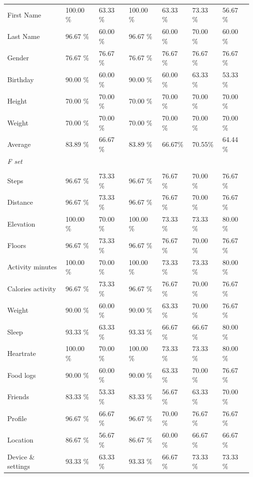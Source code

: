 \begin{table}
\begin{tabular}{P{2.5cm}P{1.7cm}P{1.6cm}P{1.5cm}P{1.5cm}P{1.5cm}P{1.9cm}}
First Name &100.00 \% & 63.33 \% &100.00 \%& 63.33 \%& 73.33 \% & 56.67 \%\\
Last Name &96.67 \% &60.00 \% &96.67 \%& 60.00 \%& 70.00 \% & 60.00 \%\\
Gender &76.67 \% &76.67 \% & 76.67 \% & 76.67 \%& 76.67 \% & 76.67 \%\\
Birthday &90.00 \%&60.00 \% &90.00 \%  & 60.00 \% & 63.33 \%& 53.33 \%\\
Height &70.00 \% &70.00 \% & 70.00 \% & 70.00 \% & 70.00 \%& 70.00 \%\\
Weight &70.00 \% &70.00 \% & 70.00 \% & 70.00 \%& 70.00 \%& 70.00 \%\\

\cmidrule(r){2-7}
Average & 83.89 \% & 66.67 \% & 83.89 \% & 66.67\% & 70.55\% & 64.44 \%\\ 
\cmidrule(r){1-7}
\textit{F set}\\
\\
Steps & 96.67 \% & 73.33 \% &96.67 \%  & 76.67 \%& 70.00 \% & 76.67 \%\\
Distance & 96.67 \% &73.33 \% &96.67 \% & 76.67 \% & 70.00 \%& 76.67 \%\\
Elevation & 100.00 \%&70.00 \% &100.00 \% & 73.33 \% & 73.33 \%& 80.00 \%\\
Floors & 96.67 \%& 73.33 \% &96.67 \% & 76.67 \% & 70.00 \% & 76.67 \%\\
Activity minutes &100.00 \% & 70.00 \% & 100.00 \% & 73.33 \% & 73.33 \% & 80.00 \%\\
Calories activity &96.67 \%&73.33 \% &96.67 \% & 76.67 \% & 70.00 \% & 76.67 \%\\
Weight &90.00 \% &60.00 \% &90.00 \% & 63.33 \% & 70.00 \%& 76.67 \%\\
Sleep &93.33 \% &63.33 \% &93.33 \% & 66.67 \% & 66.67 \% & 80.00 \%\\
Heartrate &100.00 \% &70.00 \% &100.00 \% & 73.33 \% & 73.33 \% & 80.00 \%\\
Food logs &90.00 \% &60.00 \% &90.00 \% & 63.33 \% & 70.00 \%& 76.67 \%\\
Friends &83.33 \% &53.33 \% &83.33 \% & 56.67 \% & 63.33 \% & 70.00 \%\\
Profile &96.67 \% &66.67 \% &96.67 \% & 70.00 \% &76.67 \% & 76.67 \%\\
Location  &86.67 \% &56.67 \% &86.67 \% & 60.00 \% & 66.67 \% & 66.67 \%\\
Device \& settings &93.33 \%  & 63.33 \% &93.33 \% & 66.67 \% & 73.33 \% & 73.33 \%\\


\end{tabular}
\end{table}
